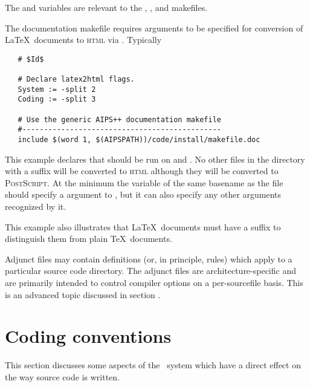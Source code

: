 \noindent
The  and  variables are relevant to the
, , and  makefiles.

The documentation makefile requires arguments to be specified for conversion
of \LaTeX\ documents to \textsc{html} via .  Typically

\begin{verbatim}
   # $Id$
 
   # Declare latex2html flags.
   System := -split 2
   Coding := -split 3
 
   # Use the generic AIPS++ documentation makefile
   #----------------------------------------------
   include $(word 1, $(AIPSPATH))/code/install/makefile.doc
\end{verbatim}

\noindent
This example declares that  should be run on
 and .  No other files in the directory
with a  suffix will be converted to \textsc{html} although they
will be converted to \textsc{PostScript}.  At the minimum the variable of
the same basename as the  file should specify a 
argument to , but it can also specify any other arguments
recognized by it.

This example also illustrates that \LaTeX\ documents must have a 
suffix to distinguish them from plain \TeX\ documents.

Adjunct  files may contain definitions (or, in principle,
rules) which apply to a particular source code directory.  The adjunct files
are architecture-specific and are primarily intended to control compiler
options on a per-sourcefile basis.  This is an advanced topic discussed in
section .


\newpage
\section{Coding conventions}
\label{Coding conventions}

This section discusses some aspects of the \aipspp\ system which have a direct
effect on the way source code is written.

